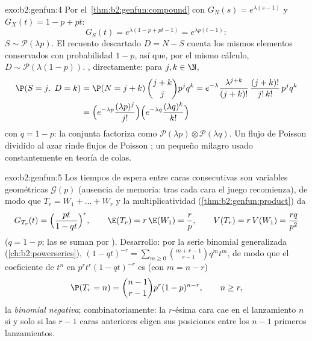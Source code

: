 \begin{solution}{exo:b2:genfun:4}
Por el~\cref{thm:b2:genfun:compound} con $G_N(s) =
e^{\lambda(s-1)}$ y $G_X(t) = 1 - p + pt$:
\[
G_S(t) = e^{\lambda(1 - p + pt - 1)} = e^{\lambda p(t - 1)} :
\]
$S \sim \mathcal{P}(\lambda p)$. El recuento descartado $D = N - S$
cuenta los mismos elementos conservados con probabilidad $1 - p$, así
que, por el mismo cálculo, $D \sim \mathcal{P}(\lambda(1 - p))$.
, directamente: para $j, k \in \N$,
\begin{align*}
\P(S = j,\ D = k)
&= \P(N = j + k)\,\binom{j+k}{j}p^jq^k
= e^{-\lambda}\frac{\lambda^{j+k}}{(j+k)!}\,
\frac{(j+k)!}{j!\,k!}\,p^jq^k\\
&= \Bigl(e^{-\lambda p}\frac{(\lambda p)^j}{j!}\Bigr)
\Bigl(e^{-\lambda q}\frac{(\lambda q)^k}{k!}\Bigr)
\end{align*}
con $q = 1 - p$: la  conjunta factoriza como
$\mathcal{P}(\lambda p) \otimes \mathcal{P}(\lambda q)$. Un flujo de
Poisson dividido al azar rinde flujos de Poisson
\emph{}; un pequeño milagro usado constantemente en teoría
de colas.
\end{solution}

\begin{solution}{exo:b2:genfun:5}
Los tiempos de espera entre caras consecutivas son variables
geométricas $\mathcal{G}(p)$  (ausencia de memoria: tras
cada cara el juego recomienza), de modo que $T_r = W_1 + \dots + W_r$
y la multiplicatividad (\cref{thm:b2:genfun:product}) da
\[
G_{T_r}(t) = \Bigl(\frac{pt}{1 - qt}\Bigr)^{r},
\qquad
\E(T_r) = r\,\E(W_1) = \frac rp,
\qquad
V(T_r) = r\,V(W_1) = \frac{rq}{p^2}
\]
($q = 1 - p$; las  se suman por ). Desarrollo:
por la serie binomial generalizada (\cref{ch:b2:powerseries}), $(1 -
qt)^{-r} = \sum_{m\geq0} \binom{m + r - 1}{r - 1}q^mt^m$, de modo que
el coeficiente de $t^n$ en $p^rt^r(1 - qt)^{-r}$ es (con $m = n - r$)
\[
\P(T_r = n) = \binom{n-1}{r-1}p^r(1-p)^{n-r},
\qquad n \geq r ,
\]
la  \emph{binomial negativa}; combinatoriamente: la $r$-ésima
cara cae en el lanzamiento $n$ si y solo si las $r - 1$ caras
anteriores eligen sus posiciones entre los $n - 1$ primeros
lanzamientos.
\end{solution}

